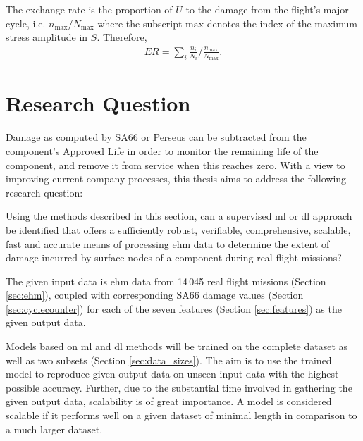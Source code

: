 The exchange rate is the proportion of \(U\) to the damage from the flight's major cycle, i.e. \(n_{\text{max}} / N_{\text{max}}\) where the subscript \(\text{max}\) denotes the index of the maximum stress amplitude in \(S\). Therefore,
\begin{align}
    ER = \sum_{i}{\frac{n_i}{N_i}} \Big/ {\frac{n_{\text{max}}}{N_{\text{max}}}}.
\end{align}
\section{Research Question} \label{sec:research_q}
Damage as computed by SA66 or Perseus can be subtracted from the component's Approved Life in order to monitor the remaining life of the component, and remove it from service when this reaches zero. With a view to improving current company processes, this thesis aims to address the following research question:

Using the methods described in this section, can a supervised \ac{ml} or \ac{dl} approach be identified that offers a sufficiently robust, verifiable, comprehensive, scalable, fast and accurate means of processing \ac{ehm} data to determine the extent of damage incurred by surface nodes of a component during real flight missions?

The given input data is \ac{ehm} data from 14\,045 real flight missions (Section \ref{sec:ehm}), coupled with corresponding SA66 damage values (Section \ref{sec:cyclecounter}) for each of the seven features (Section \ref{sec:features}) as the given output data.

Models based on \ac{ml} and \ac{dl} methods will be trained on the complete dataset as well as two subsets (Section \ref{sec:data_sizes}). The aim is to use the trained model to reproduce given output data on unseen input data with the highest possible accuracy. Further, due to the substantial time involved in gathering the given output data, scalability is of great importance. A model is considered scalable if it performs well on a given dataset of minimal length in comparison to a much larger dataset.